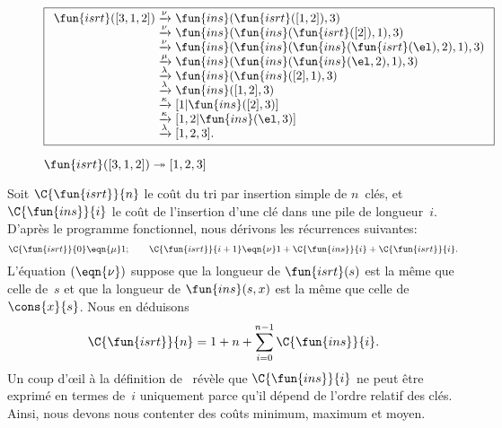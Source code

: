 \begin{figure}
\begin{equation*}
\boxed{%
\begin{array}{r@{\;}l@{\;}l}
\fun{isrt}([3,1,2])
& \xrightarrow{\smash{\nu}} & \fun{ins}(\fun{isrt}([1,2]),3)\\
& \xrightarrow{\smash{\nu}}
& \fun{ins}(\fun{ins}(\fun{isrt}([2]),1),3)\\
& \xrightarrow{\smash{\nu}}
& \fun{ins}(\fun{ins}(\fun{ins}(\fun{isrt}(\el),2),1),3)\\
& \xrightarrow{\smash{\mu}}
& \fun{ins}(\fun{ins}(\fun{ins}(\el,2),1),3)\\
& \xrightarrow{\smash{\lambda}}
& \fun{ins}(\fun{ins}([2],1),3)\\
& \xrightarrow{\smash{\lambda}}
& \fun{ins}([1,2],3)\\
& \xrightarrow{\smash{\kappa}}
& [1|\fun{ins}([2],3)]\\
& \xrightarrow{\smash{\kappa}}
& [1,2|\fun{ins}(\el,3)]\\
& \xrightarrow{\smash{\lambda}}
& [1,2,3].
\end{array}}
\end{equation*}
\caption{\(\fun{isrt}([3,1,2]) \twoheadrightarrow [1,2,3]\)
\label{fig:isrt_312}}
\end{figure}
 

Soit \(\C{\fun{isrt}}{n}\) le coût
du tri par insertion simple de \(n\)~clés, et \(\C{\fun{ins}}{i}\) le
coût de l'insertion d'une clé dans une pile de longueur~\(i\). D'après
le programme fonctionnel, nous dérivons les récurrences suivantes:
\begin{equation*}
\C{\fun{isrt}}{0}   \eqn{\smash{\mu}} 1;\qquad
\C{\fun{isrt}}{i+1} \eqn{\smash{\nu}} 1 + \C{\fun{ins}}{i} +
  \C{\fun{isrt}}{i}.
\end{equation*}
L'équation \((\eqn{\smash{\nu}})\) suppose que la longueur de
\(\fun{isrt}(s)\) est la même que celle de~\(s\) et que la longueur de
\(\fun{ins}(s,x)\) est la même que celle de \(\cons{x}{s}\). Nous en
déduisons
\begin{equation}
\C{\fun{isrt}}{n} = 1 + n + \sum_{i=0}^{n-1}\C{\fun{ins}}{i}.
\label{eq_cost_isrt}
\end{equation}
Un coup d'{\oe}il à la définition de~ révèle que
\(\C{\fun{ins}}{i}\) ne peut être exprimé en termes de~\(i\)
uniquement parce qu'il dépend de l'ordre relatif des clés. Ainsi, nous
devons nous contenter des coûts minimum, maximum et
moyen.

